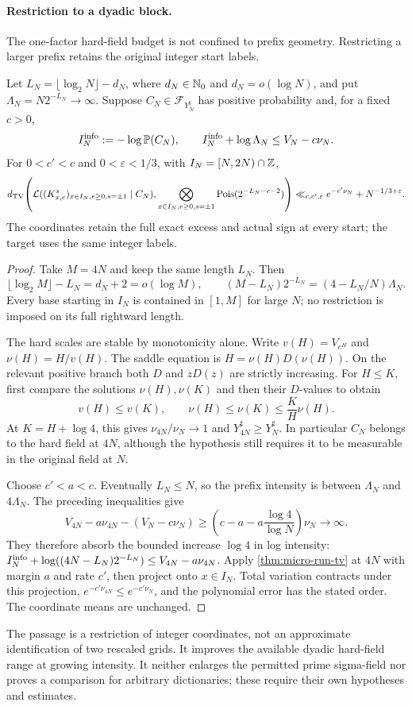 \paragraph{Restriction to a dyadic block.}
The one-factor hard-field budget is not confined to prefix geometry.
Restricting a larger prefix retains the original integer start labels.

\begin{dyadiccorollary}
\label{cor:dyadic-micro}
Let $L_N=\lfloor\log_2N\rfloor-d_N$, where $d_N\in\mathbb N_0$ and
$d_N=o(\log N)$, and put $\Lambda_N=N2^{-L_N}\to\infty$.
Suppose $C_N\in\mathcal F_{Y_N^\sharp}$ has positive probability and,
for a fixed $c>0$,
\[
 I_N^{\rm info}:=-\log\mathbb P(C_N),\qquad
 I_N^{\rm info}+\log\Lambda_N\le V_N-c\nu_N.
\]
For $0<c'<c$ and $0<\varepsilon<1/3$, with
$I_N=[N,2N)\cap\mathbb Z$,
\[
 d_{\mathrm{TV}}\!\left(
  \mathcal L((K^s_{x,e})_{x\in I_N,e\ge0,s=\pm1}\mid C_N),
  \bigotimes_{x\in I_N,e\ge0,s=\pm1}\operatorname{Pois}(2^{-L_N-e-2})
 \right)
 \ll_{c,c',\varepsilon}e^{-c'\nu_N}+N^{-1/3+\varepsilon}.
\]
The coordinates retain the full exact excess and actual sign at every
start; the target uses the same integer labels.
\end{dyadiccorollary}
\begin{proof}
Take $M=4N$ and keep the same length $L_N$. Then
\[
 \lfloor\log_2M\rfloor-L_N=d_N+2=o(\log M),\qquad
 (M-L_N)2^{-L_N}=(4-L_N/N)\Lambda_N.
\]
Every base starting in $I_N$ is contained in $[1,M]$ for large $N$;
no restriction is imposed on its full rightward length.

The hard scales are stable by monotonicity alone. Write $v(H)=V_{e^H}$
and $\nu(H)=H/v(H)$. The saddle equation is
$H=\nu(H)D(\nu(H))$. On the relevant positive branch both $D$ and
$zD(z)$ are strictly increasing. For $H\le K$, first compare the
solutions $\nu(H),\nu(K)$ and then their $D$-values to obtain
\[
 v(H)\le v(K),\qquad
 \nu(H)\le\nu(K)\le\frac KH\nu(H).
\]
At $K=H+\log4$, this gives $\nu_{4N}/\nu_N\to1$ and
$Y_{4N}^\sharp\ge Y_N^\sharp$. In particular $C_N$ belongs to the
hard field at $4N$, although the hypothesis still requires it to be
measurable in the original field at $N$.

Choose $c'<a<c$. Eventually $L_N\le N$, so the prefix intensity is
between $\Lambda_N$ and $4\Lambda_N$. The preceding inequalities give
\[
 V_{4N}-a\nu_{4N}-(V_N-c\nu_N)
 \ge \left(c-a-a\frac{\log4}{\log N}\right)\nu_N\longrightarrow\infty.
\]
They therefore absorb the bounded increase $\log4$ in log intensity:
$I_N^{\rm info}+\log((4N-L_N)2^{-L_N})\le V_{4N}-a\nu_{4N}$.
Apply \cref{thm:micro-run-tv} at $4N$ with margin $a$ and rate $c'$,
then project onto $x\in I_N$. Total variation contracts under this
projection, $e^{-c'\nu_{4N}}\le e^{-c'\nu_N}$, and the polynomial
error has the stated order. The coordinate means are unchanged.
\end{proof}
The passage is a restriction of integer coordinates, not an approximate
identification of two rescaled grids. It improves the available dyadic
hard-field range at growing intensity. It neither enlarges the permitted
prime sigma-field nor proves a comparison for arbitrary dictionaries;
these require their own hypotheses and estimates.
